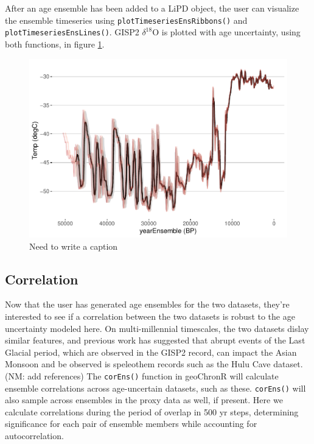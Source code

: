 \documentclass[gc, manuscript]{copernicus}
\begin{document}
After an age ensemble has been added to a LiPD object, the user can visualize the ensemble timeseries using \texttt{plotTimeseriesEnsRibbons()} and \texttt{plotTimeseriesEnsLines()}.
GISP2 \(\delta^{18}\)O is plotted with age uncertainty, using both functions, in figure \ref{fig:timeseries}.

\begin{figure}
\centering
\includegraphics{geoChronR-paper_files/figure-latex/timeseries-1.pdf}
\caption{\label{fig:timeseries}Need to write a caption}
\end{figure}

\subsection{Correlation}

Now that the user has generated age ensembles for the two datasets, they're interested to see if a correlation between the two datasets is robust to the age uncertainty modeled here.
On multi-millennial timescales, the two datasets dislay similar features, and previous work has suggested that abrupt events of the Last Glacial period, which are observed in the GISP2 record, can impact the Asian Monsoon and be observed is speleothem records such as the Hulu Cave dataset. (NM: add references)
The \texttt{corEns()} function in geoChronR will calculate ensemble correlations across age-uncertain datasets, such as these.
\texttt{corEns()} will also sample across ensembles in the proxy data as well, if present.
Here we calculate correlations during the period of overlap in 500 yr steps, determining significance for each pair of ensemble members while accounting for autocorrelation.
\end{document}
